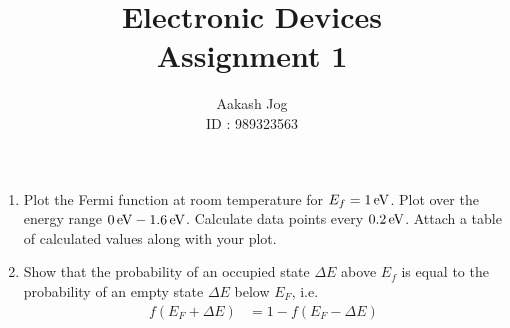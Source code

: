 \documentclass[fleqn, a4paper, 11pt, oneside]{amsart}
\title
[
	Electronic Devices : Assignment 1
]
{
	Electronic Devices\\
	Assignment 1
}
\author
{
	Aakash Jog\\
	ID : 989323563
}
\date{\formatdate{10}{3}{2016}}
\theoremstyle{definition}
\theoremstyle{theorem}
\begin{document}
\maketitle

\begin{question}
	\begin{enumerate}
		\item
			Plot the Fermi function at room temperature for $E_f = 1 \electronvolt$.
			Plot over the energy range $0 \electronvolt - 1.6 \electronvolt$.
			Calculate data points every $0.2 \electronvolt$.
			Attach a table of calculated values along with your plot.
		\item
			Show that the probability of an occupied state $\Delta E$ above $E_f$ is equal to the probability of an empty state $\Delta E$ below $E_F$, i.e.
			\begin{align*}
				f(E_F + \Delta E) & = 1 - f(E_F - \Delta E)
			\end{align*}
	\end{enumerate}
\end{question}
\end{document}
